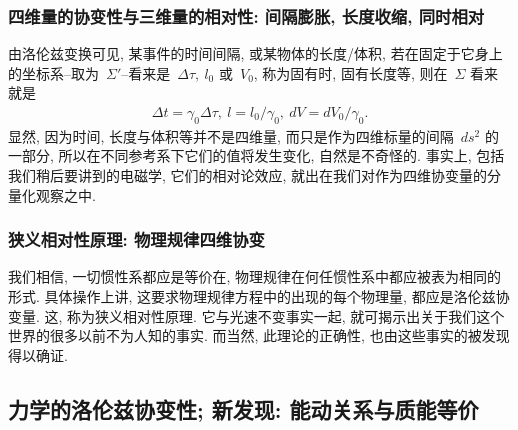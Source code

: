 \subsubsection{四维量的协变性与三维量的相对性: 间隔膨胀, 长度收缩, 同时相对}


由洛伦兹变换可见, 某事件的时间间隔, 或某物体的长度/体积, 若在固定于它身上的坐标系--取为~$\Sigma'$--看来是~$\Delta\tau,~l_0$ 或~$V_0$, 称为固有时, 固有长度等, 则在~$\Sigma$ 看来就是
\begin{gather}
\Delta t=\gamma_0\Delta\tau,~l=l_0/\gamma_0,~dV=dV_0/\gamma_0.
\end{gather}
显然, 因为时间, 长度与体积等并不是四维量, 而只是作为四维标量的间隔~$ds^2$ 的一部分, 所以在不同参考系下它们的值将发生变化, 自然是不奇怪的. 事实上, 包括我们稍后要讲到的电磁学, 它们的相对论效应, 就出在我们对作为四维协变量的分量化观察之中.




\subsubsection{狭义相对性原理: 物理规律四维协变}

我们相信, 一切惯性系都应是等价在, 物理规律在何任惯性系中都应被表为相同的形式. 具体操作上讲, 这要求物理规律方程中的出现的每个物理量, 都应是洛伦兹协变量. 这, 称为狭义相对性原理. 它与光速不变事实一起, 就可揭示出关于我们这个世界的很多以前不为人知的事实. 而当然, 此理论的正确性, 也由这些事实的被发现得以确证.


\subsection{力学的洛伦兹协变性; 新发现: 能动关系与质能等价}

